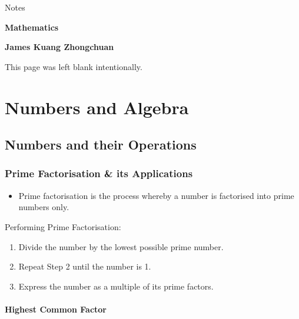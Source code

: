 \documentclass{report}
\begin{document}
\begin{titlepage}
    \begin{flushleft}
        \vspace*{1cm}

         \LARGE
	Notes
	        
        \vspace{0.5cm}
        
        \Huge
        \textbf{Mathematics}

        \vfill
        
        \textbf{James Kuang Zhongchuan}
            
    \end{flushleft}
\end{titlepage}

\tableofcontents
\newpage

\newpage
\begin{center}
This page was left blank intentionally.
\end{center}

\chapter{Numbers and Algebra}


\section{Numbers and their Operations}


\subsection{Prime Factorisation \& its Applications}

\begin{itemize}
    \item Prime factorisation is the process whereby a number is factorised into prime numbers only.
\end{itemize}
Performing Prime Factorisation:
\begin{enumerate}
    \item Divide the number by the lowest possible prime number.
    \item Repeat Step 2 until the number is 1.
    \item Express the number as a multiple of its prime factors.
\end{enumerate}

\subsubsection*{Highest Common Factor}
\end{document}

